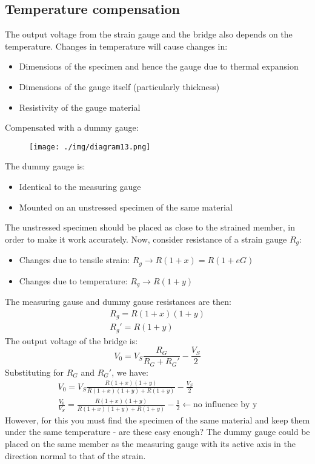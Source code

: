 \subsection{Temperature compensation}
The output voltage from the strain gauge and the bridge also depends on the temperature. Changes in temperature will cause changes in:
\begin{itemize}
  \item Dimensions of the specimen and hence the gauge due to thermal expansion
  \item Dimensions of the gauge itself (particularly thickness)
  \item Resistivity of the gauge material
\end{itemize}
Compensated with a dummy gauge:
\begin{figure}[H]
  \centering
  \texttt{[image: ./img/diagram13.png]}
\end{figure}
The dummy gauge is:
\begin{itemize}
  \item Identical to the measuring gauge
  \item Mounted on an unstressed specimen of the same material
\end{itemize}
The unstressed specimen should be placed as close to the strained member, in order to make it work accurately. Now, consider resistance of a strain gauge $R_g$:
\begin{itemize}
  \item Changes due to tensile strain: $R_g \rightarrow R(1+x) = R(1+eG)$
  \item Changes due to temperature: $R_g \rightarrow R(1+y)$
\end{itemize}
The measuring gause and dummy gause resistances are then:
\begin{align}
  R_g = R(1+x)(1+y) \\
  R_g' = R(1+y)
\end{align}
The output voltage of the bridge is:
\begin{equation}
  V_0 = V_S \frac{R_G}{R_G + R_G'} - \frac{V_S}{2}
\end{equation}
Substituting for $R_G$ and $R_G'$, we have:
\begin{gather}
  V_0 = V_S \frac{R(1+x)(1+y)}{R(1+x)(1+y) + R(1+y)} - \frac{V_S}{2}\\
  \frac{V_0}{V_S} = \frac{R(1+x)(1+y)}{R(1+x)(1+y) + R(1+y)} - \frac{1}{2} \leftarrow \textrm{no influence by y}
\end{gather}
However, for this you must find the specimen of the same material and keep them under the same temperature - are these easy enough? The dummy gauge could be placed on the same member as the measuring gauge with its active axis in the direction normal to that of the strain.
